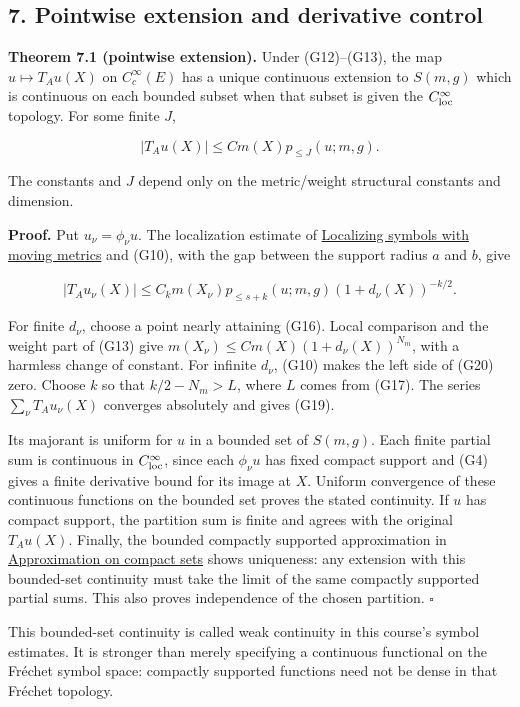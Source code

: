 \documentclass[
  11pt,
]{article}
\begin{document}
\subsection{7. Pointwise extension and derivative
control}\label{pointwise-extension-and-derivative-control}

\textbf{Theorem 7.1 (pointwise extension).} Under (G12)--(G13), the map
\(u\mapsto T_Au(X)\) on \(C_c^\infty(E)\) has a unique continuous
extension to \(S(m,g)\) which is continuous on each bounded subset when
that subset is given the \(C^\infty_{\rm loc}\) topology. For some
finite \(J\),

\[
|T_Au(X)|\leq C m(X)p_{\leq J}(u;m,g).                       \tag{G19}
\]

The constants and \(J\) depend only on the metric/weight structural
constants and dimension.

\textbf{Proof.} Put \(u_\nu=\phi_\nu u\). The localization estimate of
\href{metric-localization.pdf}{Localizing symbols with moving metrics}
and (G10), with the gap between the support radius \(a\) and \(b\), give

\[
|T_Au_\nu(X)|
\leq C_k m(X_\nu)p_{\leq s+k}(u;m,g)
(1+d_\nu(X))^{-k/2}.                                       \tag{G20}
\]

For finite \(d_\nu\), choose a point nearly attaining (G16). Local
comparison and the weight part of (G13) give
\(m(X_\nu)\leq C m(X)(1+d_\nu(X))^{N_m}\), with a harmless change of
constant. For infinite \(d_\nu\), (G10) makes the left side of (G20)
zero. Choose \(k\) so that \(k/2-N_m>L\), where \(L\) comes from (G17).
The series \(\sum_\nu T_Au_\nu(X)\) converges absolutely and gives
(G19).

Its majorant is uniform for \(u\) in a bounded set of \(S(m,g)\). Each
finite partial sum is continuous in \(C^\infty_{\rm loc}\), since each
\(\phi_\nu u\) has fixed compact support and (G4) gives a finite
derivative bound for its image at \(X\). Uniform convergence of these
continuous functions on the bounded set proves the stated continuity. If
\(u\) has compact support, the partition sum is finite and agrees with
the original \(T_Au(X)\). Finally, the bounded compactly supported
approximation in
\href{metric-localization.pdf\#section*.28}{Approximation
on compact sets} shows uniqueness: any extension with this bounded-set
continuity must take the limit of the same compactly supported partial
sums. This also proves independence of the chosen partition. \(\square\)

This bounded-set continuity is called weak continuity in this course's
symbol estimates. It is stronger than merely specifying a continuous
functional on the Fréchet symbol space: compactly supported functions
need not be dense in that Fréchet topology.
\end{document}
